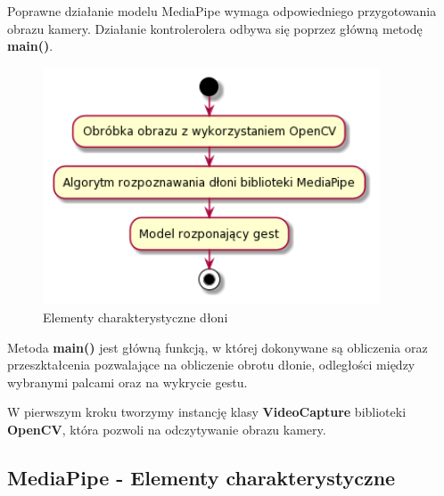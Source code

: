     \quad Poprawne działanie modelu MediaPipe wymaga odpowiedniego przygotowania obrazu kamery. Działanie kontrolerolera odbywa się poprzez główną metodę \textbf{main()}.
    
    \begin{figure}[H]
        \begin{center}
            \includegraphics[width=10cm]{../images/image_processing.png}
            \caption{Elementy charakterystyczne dłoni}
        \end{center}
    \end{figure}

    \quad Metoda \textbf{main()} jest główną funkcją, w której dokonywane są obliczenia oraz przeszktałcenia pozwalające na obliczenie obrotu dłonie, odległości między wybranymi palcami oraz na wykrycie gestu. 
    
    
    
    \quad W pierwszym kroku tworzymy instancję klasy \textbf{VideoCapture} biblioteki \textbf{OpenCV}, która pozwoli na odczytywanie obrazu kamery. 
    
    
    
    
    \subsection{MediaPipe - Elementy charakterystyczne}
    
